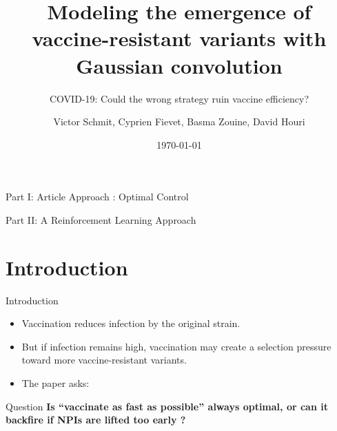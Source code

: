 \documentclass[
11pt,notheorems,hyperref={pdfauthor=whatever}
]{beamer}
\title[
Vaccination vs NPI]{Modeling the emergence of vaccine-resistant variants with Gaussian convolution}
\subtitle{COVID-19: Could the wrong strategy ruin vaccine efficiency?}
\author[
]{
Victor Schmit, 
Cyprien Fievet,
Basma Zouine,
David Houri
}
\institute{CentraleSupélec}
\date{\today}
\begin{document}
{
\begin{frame}
	\titlepage
\end{frame}
}
\addtocounter{framenumber}{-1}

\begin{frame}{Part I: Article Approach : Optimal Control}
	\tableofcontents[part=1]
\end{frame}

\begin{frame}{Part II: A Reinforcement Learning Approach}
	\tableofcontents[part=2]
\end{frame}


\section{Introduction}

\begin{frame}{Introduction}
	\begin{itemize}
		\item Vaccination reduces infection by the original strain.

		      \medskip

		\item But if infection remains high, vaccination may create a \alert{selection pressure}
		      toward more vaccine-resistant variants.

		      \medskip

		\item The paper asks:
	\end{itemize}

	\medskip

	\begin{block}{Question}
		\textbf{Is ``vaccinate as fast as possible'' always optimal, or can it backfire if NPIs are lifted too early ?}
	\end{block}
\end{frame}

%
%
%
%
%
%
%
%
\end{document}
